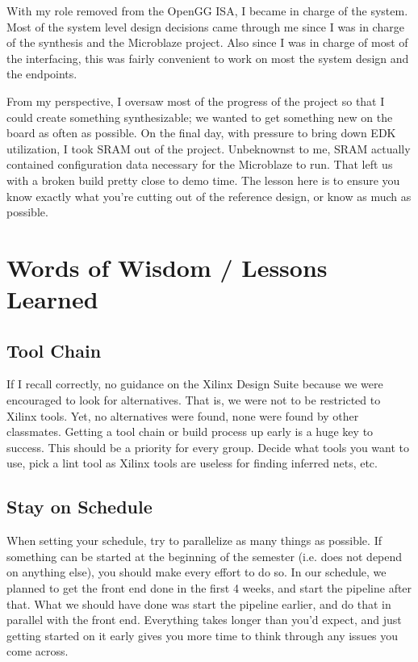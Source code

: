 \documentclass[letterpaper,10pt]{article}
\begin{document}
With my role removed from the OpenGG ISA, I became in charge of the system.  Most of the system level design decisions came through me since I was in charge of the synthesis and the Microblaze project.  Also since I was in charge of most of the interfacing, this was fairly convenient to work on most the system design and the endpoints.  

From my perspective, I oversaw most of the progress of the project so that I could create something synthesizable; we wanted to get something new on the board as often as possible.  On the final day, with pressure to bring down EDK utilization, I took SRAM out of the project.  Unbeknownst to me, SRAM actually contained configuration data necessary for the Microblaze to run.  That left us with a broken build pretty close to demo time.   The lesson here is to ensure you know exactly what you're cutting out of the reference design, or know as much as possible.

\section{Words of Wisdom / Lessons Learned}

\subsection{Tool Chain}
If I recall correctly, no guidance on the Xilinx Design Suite because we were encouraged to look for alternatives.  That is, we were not to be restricted to Xilinx tools.  Yet, no alternatives were found, none were found by other classmates.  Getting a tool chain or build process up early is a huge key to success.  This should be a priority for every group. Decide what tools you want to use, pick a lint tool as Xilinx tools are useless for finding inferred nets, etc.

\subsection{Stay on Schedule}
When setting your schedule, try to parallelize as many things as possible. If something can be started at the beginning of the semester (i.e. does not depend on anything else), you should make every effort to do so. In our schedule, we planned to get the front end done in the first 4 weeks, and start the pipeline after that. What we should have done was start the pipeline earlier, and do that in parallel with the front end. Everything takes longer than you'd expect, and just getting started on it early gives you more time to think through any issues you come across.
\end{document}
